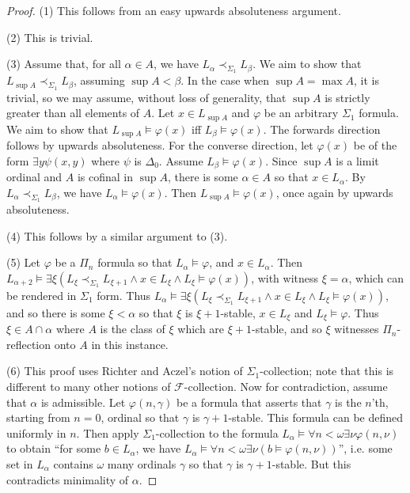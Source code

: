 \documentclass{article}
\theoremstyle{definition}
\theoremstyle{plain}
\theoremstyle{plain}
\theoremstyle{plain}
\theoremstyle{plain}
\theoremstyle{remark}
\theoremstyle{remark}
\theoremstyle{remark}
\theoremstyle{plain}
\theoremstyle{plain}
\theoremstyle{plain}
\begin{document}
\begin{proof}
(1) This follows from an easy upwards absoluteness argument.

(2) This is trivial.

(3) Assume that, for all $\alpha \in A$, we have $L_\alpha \prec_{\Sigma_1} L_\beta$. We aim to show that $L_{\sup A} \prec_{\Sigma_1} L_\beta$, assuming $\sup A < \beta$. In the case when $\sup A = \max A$, it is trivial, so we may assume, without loss of generality, that $\sup A$ is strictly greater than all elements of $A$. Let $x \in L_{\sup A}$ and $\varphi$ be an arbitrary $\Sigma_1$ formula. We aim to show that $L_{\sup A} \models \varphi(x)$ iff $L_\beta \models \varphi(x)$. The forwards direction follows by upwards absoluteness. For the converse direction, let $\varphi(x)$ be of the form $\exists y \psi(x,y)$ where $\psi$ is $\Delta_0$. Assume $L_\beta \models \varphi(x)$. Since $\sup A$ is a limit ordinal and $A$ is cofinal in $\sup A$, there is some $\alpha \in A$ so that $x \in L_\alpha$. By $L_\alpha \prec_{\Sigma_1} L_\beta$, we have $L_\alpha \models \varphi(x)$. Then $L_{\sup A} \models \varphi(x)$, once again by upwards absoluteness.

(4) This follows by a similar argument to (3).

(5) Let $\varphi$ be a $\Pi_n$ formula so that $L_\alpha \models \varphi$, and $x \in L_\alpha$. Then $L_{\alpha+2} \models \exists \xi (L_\xi \prec_{\Sigma_1} L_{\xi+1} \land x \in L_\xi \land L_\xi \models \varphi(x))$, with witness $\xi = \alpha$, which can be rendered in $\Sigma_1$ form. Thus $L_\alpha \models \exists \xi (L_\xi \prec_{\Sigma_1} L_{\xi+1} \land x \in L_\xi \land L_\xi \models \varphi(x))$, and so there is some $\xi < \alpha$ so that $\xi$ is $\xi+1$-stable, $x \in L_\xi$ and $L_\xi \models \varphi$. Thus $\xi \in A \cap \alpha$ where $A$ is the class of $\xi$ which are $\xi+1$-stable, and so $\xi$ witnesses $\Pi_n$-reflection onto $A$ in this instance.

(6) This proof uses Richter and Aczel's notion of $\Sigma_1$-collection; note that this is different to many other notions of $\mathcal{F}$-collection. Now for contradiction, assume that $\alpha$ is admissible. Let $\varphi(n, \gamma)$ be a formula that asserts that $\gamma$ is the $n$'th, starting from $n = 0$, ordinal so that $\gamma$ is $\gamma+1$-stable. This formula can be defined uniformly in $n$. Then apply $\Sigma_1$-collection to the formula $L_\alpha \models \forall n < \omega \exists \nu \varphi(n, \nu)$ to obtain ``for some $b \in L_\alpha$, we have $L_\alpha \models \forall n < \omega \exists \nu (b \models \varphi(n, \nu))$'', i.e. some set in $L_\alpha$ contains $\omega$ many ordinals $\gamma$ so that $\gamma$ is $\gamma+1$-stable. But this contradicts minimality of $\alpha$.
\end{proof}
\end{document}
